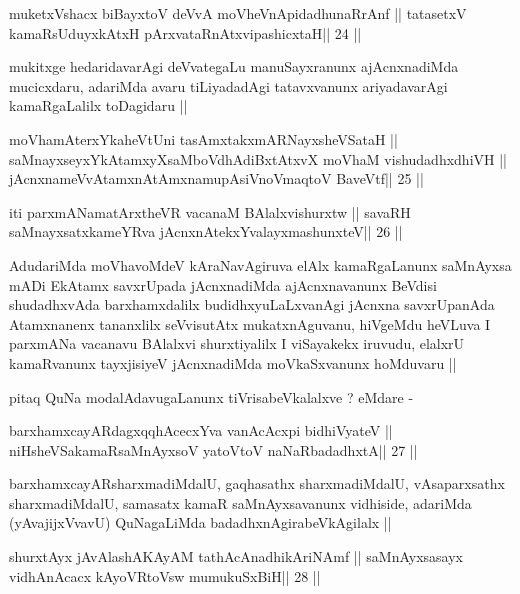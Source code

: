\begin{shl}
muketxVshacx biBayxtoV deVvA moVheVnApidadhunaRrAnf ||
tatasetxV kamaRsUduyxkAtxH pArxvataRnAtxvipashicxtaH\hfill || 24 ||
\end{shl}

\begin{artha}
mukitxge hedaridavarAgi deVvategaLu manuSayxranunx ajAcnxnadiMda
mucicxdaru, adariMda avaru tiLiyadadAgi tatavxvanunx ariyadavarAgi
kamaRgaLalilx toDagidaru ||
\end{artha}

\begin{shl}
moVhamAterxYkaheVtUni tasAmxtakxmARNayxsheVSataH ||
saMnayxseyxYkAtamxyXsaMboVdhAdiBxtAtxvX moVhaM vishudadhxdhiVH ||
jAcnxnameVvA\s\s tamxnA\s\s tAmxnamupAsiVnoV\s maqtoV BaveVtf\hfill || 25 ||
\end{shl}

\begin{shl}
iti parxmANamatArxtheVR vacanaM BAlalxvishurxtw ||
savaRH saMnayxsatxkameYRva jAcnxnAtekxYvalayxmashunxteV\hfill || 26 ||
\end{shl}

\begin{artha}
AdudariMda moVhavoMdeV kAraNavAgiruva elAlx kamaRgaLanunx saMnAyxsa
mADi EkAtamx savxrUpada jAcnxnadiMda ajAcnxnavanunx BeVdisi
shudadhxvAda barxhamxdalilx budidhxyuLaLxvanAgi jAcnxna savxrUpanAda
Atamxnanenx tananxlilx seVvisutAtx mukatxnAguvanu, hiVgeMdu heVLuva I
parxmANa vacanavu BAlalxvi shurxtiyalilx I viSayakekx iruvudu, elalxrU
kamaRvanunx tayxjisiyeV jAcnxnadiMda moVkaSxvanunx hoMduvaru ||

pitaq QuNa modalAdavugaLanunx tiVrisabeVkalalxve ? eMdare -
\end{artha}

\begin{shl}
barxhamxcayARdagxqqhAcecxYva vanAcAcxpi bidhiVyateV ||
niHsheVSakamaRsaMnAyxsoV yatoV\s toV naNaRbadadhxtA\hfill || 27 ||
\end{shl}

\begin{artha}
barxhamxcayARsharxmadiMdalU, gaqhasathx sharxmadiMdalU, vAsaparxsathx
sharxmadiMdalU, samasatx kamaR saMnAyxsavanunx vidhiside, adariMda
(yAvajijxVvavU) QuNagaLiMda badadhxnAgirabeVkAgilalx ||
\end{artha}

\begin{shl}
\footnotemark[1]shurxtAyx jAvAlashAKAyAM tathAcAnadhikAriNAmf ||
saMnAyxsasayx vidhAnAcacx kAyoVR\s toV\s sw mumukuSxBiH\hfill || 28 ||
\end{shl}

